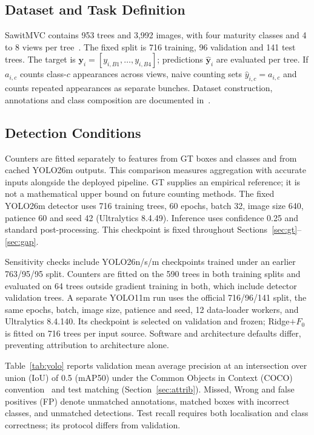 \documentclass[conference,a4paper]{IEEEtran}
\begin{document}
\subsection{Dataset and Task Definition}
\label{sec:task}
SawitMVC contains 953 trees and 3,992 images, with four maturity classes and
4 to 8 views per tree~\cite{refIndriani2026}. The fixed split is 716 training,
96 validation and 141 test trees. The target is
$\mathbf y_i=[y_{i,B1},\ldots,y_{i,B4}]$; predictions
$\hat{\mathbf y}_i$ are evaluated per tree. If $a_{i,c}$ counts class-$c$
appearances across views, naive counting sets $\hat y_{i,c}=a_{i,c}$ and counts
repeated appearances as separate bunches. Dataset construction, annotations
and class composition are documented in~\cite{refIndriani2026}.

\subsection{Detection Conditions}
Counters are fitted separately to features from GT boxes and classes and from
cached YOLO26m outputs. This comparison measures aggregation with accurate
inputs alongside the deployed pipeline. GT supplies an empirical reference;
it is not a mathematical upper bound on future counting methods. The fixed YOLO26m detector uses 716 training trees, 60 epochs,
batch 32, image size 640, patience 60 and seed 42 (Ultralytics 8.4.49). Inference
uses confidence 0.25 and standard post-processing. This checkpoint is fixed
throughout Sections~\ref{sec:gt}--\ref{sec:gap}.

Sensitivity checks include YOLO26n/s/m checkpoints trained under an earlier
763/95/95 split. Counters are fitted on the 590 trees in both training splits
and evaluated on 64 trees outside gradient training in both, which include
detector validation trees. A separate YOLO11m run uses the official 716/96/141 split,
the same epochs, batch, image size, patience and seed, 12 data-loader workers,
and Ultralytics 8.4.140. Its checkpoint is selected on validation and frozen;
Ridge$+F_0$ is fitted on 716 trees per input source. Software and architecture
defaults differ, preventing attribution to architecture alone.

Table~\ref{tab:yolo} reports validation mean average precision at an
intersection over union (IoU) of 0.5 (mAP50) under the Common Objects in
Context (COCO) convention~\cite{ref16} and test matching
(Section~\ref{sec:attrib}). Missed, Wrong and false positives (FP) denote
unmatched annotations, matched boxes with incorrect classes, and unmatched
detections. Test recall requires both localisation and class
correctness; its protocol differs from validation.
\end{document}
